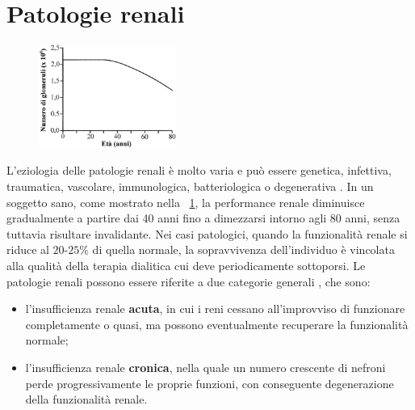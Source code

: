 \section{Patologie renali}
\begin{figure}
	\centering
	\vspace{-10pt}
		\includegraphics[width=0.4\textwidth]{immagini/eta_gfr.eps}
		\vspace{-20pt}
		\caption{}\label{eta_gfr}
		\vspace{-10pt}
\end{figure}
L'eziologia delle patologie renali è molto varia e può essere genetica, infettiva, traumatica, vascolare, immunologica, batteriologica o degenerativa \cite{bronzino}.
In un soggetto sano, come mostrato nella \figurename~\ref{eta_gfr}, la performance renale diminuisce gradualmente a partire dai 40 anni fino a dimezzarsi intorno agli 80 anni, senza tuttavia risultare invalidante. Nei casi patologici, quando la funzionalità renale si riduce al $20$-$25\%$ di quella normale, la sopravvivenza dell'individuo è vincolata alla qualità della terapia dialitica cui deve periodicamente sottoporsi.
Le patologie renali possono essere riferite a due categorie generali \cite{guyton}, che sono:
\begin{itemize}
	\item l'insufficienza renale \textbf{acuta}, in cui i reni cessano all'improvviso di funzionare completamente o quasi, ma possono eventualmente recuperare la funzionalità normale;
	\item l'insufficienza renale \textbf{cronica}, nella quale un numero crescente di nefroni perde progressivamente le proprie funzioni, con conseguente degenerazione della funzionalità renale.
\end{itemize}

